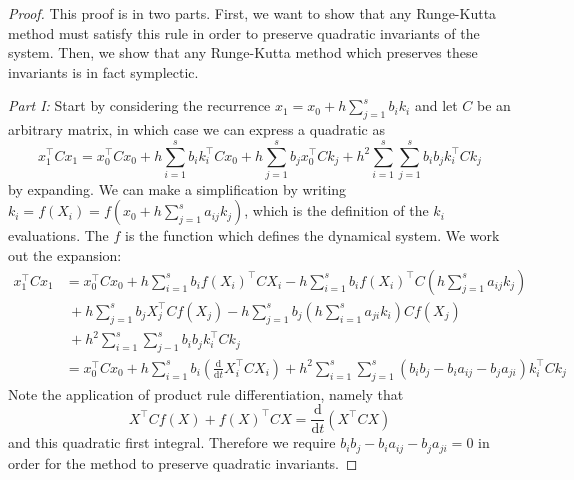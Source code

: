 \begin{proof}

This proof is in two parts. First, we want to show that any Runge-Kutta method must satisfy this rule in order to preserve quadratic invariants of the system.
Then, we show that any Runge-Kutta method which preserves these invariants is in fact symplectic.

\textit{Part I:}
Start by considering the recurrence $x_1 = x_0 + h \sum_{j=1}^{s} b_i k_i$ and let $C$ be an arbitrary matrix, in which case we can express a quadratic as
\begin{equation}
	x_1^\intercal C x_1 = x_0^\intercal C x_0 + h \sum_{i=1}^{s} b_i k_i^\intercal C x_0 + h \sum_{j=1}^{s} b_j x_0^\intercal C k_j + h^2 \sum_{i=1}^{s} \sum_{j=1}^{s} b_i b_j k_i^\intercal C k_j
\end{equation} %
by expanding. We can make a simplification by writing $k_i = f(X_i) = f\left(x_0 + h \sum_{j=1}^{s}a_{ij}k_j\right)$, which is the definition of the $k_i$ evaluations.
The $f$ is the function which defines the dynamical system.
We work out the expansion:
\begin{align*}
	x_1^\intercal C x_1 &= x_0^\intercal C x_0 + h \sum_{i = 1}^{s} b_i f(X_i)^\intercal C X_i - h \sum_{i=1}^{s}b_i f(X_i)^\intercal C \left( h\sum_{j=1}^{s}a_{ij} k_j \right) \\
	&~ +h \sum_{j = 1}^{s} b_j X_j^\intercal C f(X_j) - h \sum_{j=1}^{s}b_j \left( h\sum_{i=1}^{s}a_{ji} k_i \right) C f(X_j) \\
	&~ + h^2 \sum_{i=1}^{s} \sum_{j-1}^{s} b_i b_j k_i^\intercal C k_j \\
	&= x_0^\intercal C x_0 + h \sum_{i=1}^{s} b_i \left(
		\frac{\mathrm{d}}{\mathrm{d}t} X_i^\intercal C X_i
	\right) + h^2 \sum_{i=1}^{s} \sum_{j=1}^{s} (b_i b_j - b_i a_{ij} - b_j a_{ji})k_i^\intercal C k_j
\end{align*}
Note the application of product rule differentiation, namely that
\begin{equation*}
	X^\intercal C f(X) + f(X)^\intercal C X = \frac{\mathrm{d}}{\mathrm{d}t} (X^\intercal C X)
\end{equation*}
and this quadratic first integral.
Therefore we require $b_i b_j - b_i a_{ij} - b_j a_{ji} = 0$ in order for the method to preserve quadratic invariants.


\end{proof}
